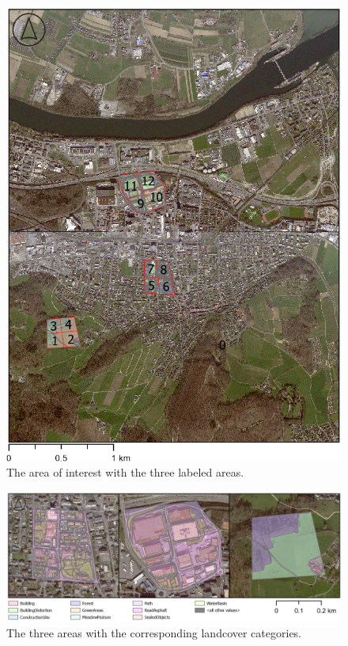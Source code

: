 \begin{figure}[H]
    \centering
    \captionsetup{width=0.8\linewidth}
    \includegraphics[scale=0.6]{figures/AOI_Labeled.png}
    \caption{The area of interest with the three labeled areas.}
    \label{fig:aoi_labeled}
\end{figure}

\begin{figure}[H]
    \centering
    \captionsetup{width=0.8\linewidth}
    \includegraphics[width=\linewidth]{figures/category_areas.png}
    \caption{The three areas with the corresponding landcover categories.}
    \label{fig:category_areas}
\end{figure}


